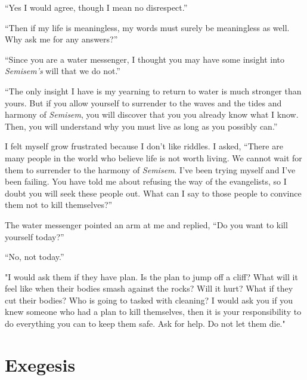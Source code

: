 \documentclass[12pt, letterpaper]{report}
\begin{document}
\vspace{1\baselineskip}
``Yes I would agree, though I mean no disrespect.''

\vspace{1\baselineskip}
``Then if my life is meaningless, my words must surely be meaningless as well. Why ask me for any answers?''

\vspace{1\baselineskip}
``Since you are a water messenger, I thought you may have some insight into \textit{Semisem's} will that we do not.''

\vspace{1\baselineskip}
``The only insight I have is my yearning to return to water is much stronger than yours. But if you allow yourself to surrender to the waves and the tides and harmony of \textit{Semisem}, you will discover that you you already know what I know. Then, you will understand why you must live as long as you possibly can.''

\vspace{1\baselineskip}
I felt myself grow frustrated because I don't like riddles. I asked, ``There are many people in the world who believe life is not worth living. We cannot wait for them to surrender to the harmony of \textit{Semisem}. I've been trying myself and I've been failing. You have told me about refusing the way of the evangelists, so I doubt you will seek these people out. What can I say to those people to convince them not to kill themselves?''

\vspace{1\baselineskip}
The water messenger pointed an arm at me and replied, ``Do you want to kill yourself today?''

\vspace{1\baselineskip}
``No, not today.''

\vspace{1\baselineskip}
"I would ask them if they have plan. Is the plan to jump off a cliff? What will it feel like when their bodies smash against the rocks? Will it hurt? What if they cut their bodies? Who is going to tasked with cleaning? I would ask you if you knew someone who had a plan to kill themselves, then it is your responsibility to do everything you can to keep them safe. Ask for help. Do not let them die."

\part{Exegesis}
\end{document}

